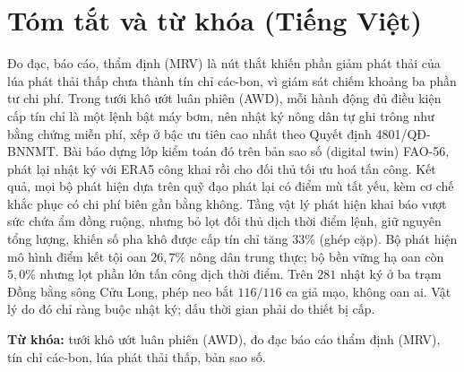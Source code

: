 %
%

\section*{Tóm tắt và từ khóa (Tiếng Việt)}

Đo đạc, báo cáo, thẩm định (MRV) là nút thắt khiến phần giảm phát thải của lúa phát thải thấp chưa thành tín chỉ các-bon, vì giám sát chiếm khoảng ba phần tư chi phí. Trong tưới khô ướt luân phiên (AWD), mỗi hành động đủ điều kiện cấp tín chỉ là một lệnh bật máy bơm, nên nhật ký nông dân tự ghi trông như bằng chứng miễn phí, xếp ở bậc ưu tiên cao nhất theo Quyết định 4801/QĐ-BNNMT. Bài báo dựng lớp kiểm toán đó trên bản sao số (digital twin) FAO-56, phát lại nhật ký với ERA5 công khai rồi cho đối thủ tối ưu hoá tấn công. Kết quả, mọi bộ phát hiện dựa trên quỹ đạo phát lại có điểm mù tất yếu, kèm cơ chế khắc phục có chi phí biên gần bằng không. Tầng vật lý phát hiện khai báo vượt sức chứa ẩm đồng ruộng, nhưng bỏ lọt đối thủ dịch thời điểm lệnh, giữ nguyên tổng lượng, khiến số pha khô được cấp tín chỉ tăng $33\%$ (ghép cặp). Bộ phát hiện mô hình điểm kết tội oan $26{,}7\%$ nông dân trung thực; bộ bền vững hạ oan còn $5{,}0\%$ nhưng lọt phần lớn tấn công dịch thời điểm. Trên $281$ nhật ký ở ba trạm Đồng bằng sông Cửu Long, phép neo bắt $116/116$ ca giả mạo, không oan ai. Vật lý do đó chỉ ràng buộc nhật ký; dấu thời gian phải do thiết bị cấp.

\textbf{Từ khóa:} tưới khô ướt luân phiên (AWD), đo đạc báo cáo thẩm định
(MRV), tín chỉ các-bon, lúa phát thải thấp, bản sao số.

